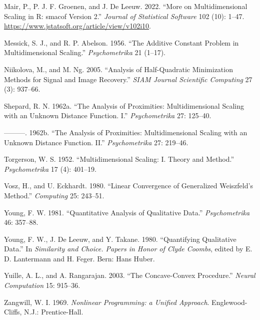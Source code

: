 \documentclass[
  12pt,
]{article}
\newlength{\cslhangindent}
\newenvironment{CSLReferences}[2] %
 {\begin{list}{}{%
  \setlength{\itemindent}{0pt}
  \setlength{\leftmargin}{0pt}
  \setlength{\parsep}{0pt}
  \ifodd #1
   \setlength{\leftmargin}{\cslhangindent}
   \setlength{\itemindent}{-1\cslhangindent}
  \fi
  \setlength{\itemsep}{#2\baselineskip}}}
 {\end{list}}
\begin{document}
\begin{CSLReferences}{1}{0}
Mair, P., P. J. F. Groenen, and J. De Leeuw. 2022. {``{More on Multidimensional Scaling in R: smacof Version 2}.''} \emph{Journal of Statistical Software} 102 (10): 1--47. \url{https://www.jstatsoft.org/article/view/v102i10}.

Messick, S. J., and R. P. Abelson. 1956. {``{The Additive Constant Problem in Multidimensional Scaling}.''} \emph{Psychometrika} 21 (1--17).

Niikolova, M., and M. Ng. 2005. {``Analysis of Half-Quadratic Minimization Methods for Signal and Image Recovery.''} \emph{SIAM Journal Scientific Computing} 27 (3): 937--66.

Shepard, R. N. 1962a. {``{The Analysis of Proximities: Multidimensional Scaling with an Unknown Distance Function. I}.''} \emph{Psychometrika} 27: 125--40.

---------. 1962b. {``{The Analysis of Proximities: Multidimensional Scaling with an Unknown Distance Function. II}.''} \emph{Psychometrika} 27: 219--46.

Torgerson, W. S. 1952. {``{Multidimensional Scaling: I. Theory and Method}.''} \emph{Psychometrika} 17 (4): 401--19.

Vosz, H., and U. Eckhardt. 1980. {``{Linear Convergence of Generalized {W}eiszfeld's Method}.''} \emph{Computing} 25: 243--51.

Young, F. W. 1981. {``{Quantitative Analysis of Qualitative Data}.''} \emph{Psychometrika} 46: 357--88.

Young, F. W., J. De Leeuw, and Y. Takane. 1980. {``Quantifying Qualitative Data.''} In \emph{Similarity and Choice. Papers in Honor of Clyde Coombs}, edited by E. D. Lantermann and H. Feger. Bern: Hans Huber.

Yuille, A. L., and A. Rangarajan. 2003. {``{The Concave-Convex Procedure}.''} \emph{Neural Computation} 15: 915--36.

Zangwill, W. I. 1969. \emph{{Nonlinear Programming: a Unified Approach}}. Englewood-Cliffs, N.J.: Prentice-Hall.

\end{CSLReferences}
\end{document}
